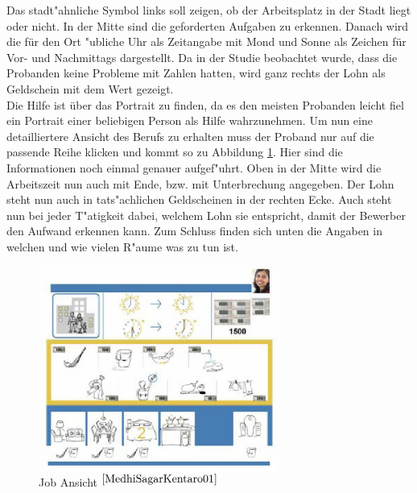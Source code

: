 Das stadt"ahnliche Symbol links soll zeigen, ob der Arbeitsplatz in der Stadt liegt oder nicht. In der Mitte sind die geforderten Aufgaben zu erkennen. Danach wird die für den Ort "ubliche Uhr als Zeitangabe mit Mond und Sonne als Zeichen für Vor- und Nachmittags dargestellt. Da in der Studie beobachtet wurde, dass die Probanden keine Probleme mit Zahlen hatten, wird ganz rechts der Lohn als Geldschein mit dem Wert gezeigt.\\
Die Hilfe ist über das Portrait zu finden, da es den meisten Probanden leicht fiel ein Portrait einer beliebigen Person als Hilfe wahrzunehmen. Um nun eine detailliertere Ansicht des Berufs zu erhalten muss der Proband nur auf die passende Reihe klicken und kommt so zu Abbildung \ref{fig:jobclose}.
Hier sind die Informationen noch einmal genauer aufgef"uhrt. Oben in der Mitte wird die Arbeitszeit nun auch mit Ende, bzw. mit Unterbrechung angegeben. Der Lohn steht nun auch in tats"achlichen Geldscheinen in der rechten Ecke. Auch steht nun bei jeder T"atigkeit dabei, welchem Lohn sie entspricht, damit der Bewerber den Aufwand erkennen kann. Zum Schluss finden sich unten die Angaben in welchen und wie vielen R"aume was zu tun ist.

\begin{figure}[h]
	\centering
		\includegraphics[width=0.7\textwidth]{Daten/job_close.PNG}
	\caption{Job Ansicht $^{\ref{MedhiSagarKentaro01}}$}
	\label{fig:jobclose}
\end{figure}

\clearpage
